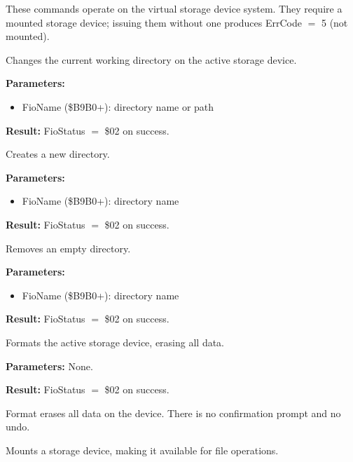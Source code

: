 These commands operate on the virtual storage device system.  They require a
mounted storage device; issuing them without one produces ErrCode $=$ 5
(not mounted).


Changes the current working directory on the active storage device.

\textbf{Parameters:}
\begin{itemize}
  \item FioName (\$B9B0+): directory name or path
\end{itemize}

\textbf{Result:} FioStatus $=$ \$02 on success.

\medskip


Creates a new directory.

\textbf{Parameters:}
\begin{itemize}
  \item FioName (\$B9B0+): directory name
\end{itemize}

\textbf{Result:} FioStatus $=$ \$02 on success.

\medskip


Removes an empty directory.

\textbf{Parameters:}
\begin{itemize}
  \item FioName (\$B9B0+): directory name
\end{itemize}

\textbf{Result:} FioStatus $=$ \$02 on success.

\medskip


Formats the active storage device, erasing all data.

\textbf{Parameters:} None.

\textbf{Result:} FioStatus $=$ \$02 on success.

\begin{warningbox}
Format erases all data on the device.  There is no confirmation prompt
and no undo.
\end{warningbox}

\medskip


Mounts a storage device, making it available for file operations.

